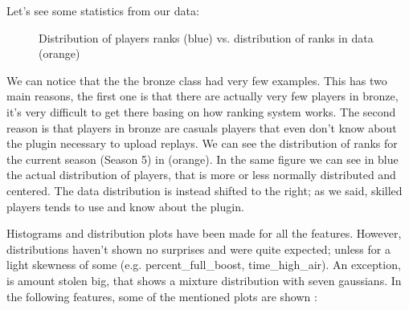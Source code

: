 Let's see some statistics from our data:

\begin{figure}[H]
    \label{fig:rank_distr}
    \caption{Distribution of players ranks (blue) vs. distribution of ranks in data (orange)}
\end{figure}

We can notice that the the bronze class had very few examples. This has two main reasons, the first one is that there are actually very few players in bronze, it's very difficult to get there basing on how ranking system works. The second reason is that players in bronze are casuals players that even don't know about the plugin necessary to upload replays. We can see the distribution of ranks for the current season (Season 5) in  (orange). In the same figure we can see in blue the actual distribution of players, that is more or less normally distributed and centered. The data distribution is instead shifted to the right; as we said, skilled players tends to use and know about the plugin.

Histograms and distribution plots have been made for all the features. However, distributions haven't shown no surprises and were quite expected; unless for a light skewness of some (e.g. percent\_full\_boost, time\_high\_air). An exception, is amount stolen big, that shows a mixture distribution with seven gaussians.
In the following features, some of the mentioned plots are shown :

